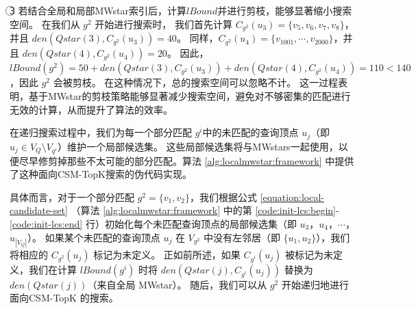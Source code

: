 \textcircled{3} 若结合全局和局部MWstar索引后，计算$lBound$并进行剪枝，能够显著缩小搜索空间。
在我们从 $g^2$ 开始进行搜索时，
我们首先计算 $C_{g^2}(u_3)=\{v_5, v_6, v_7, v_8\}$，并且 $den(Qstar(3), C_{g^2}(u_3)) = 40$。
同样，$C_{g^2}(u_4)=\{v_{1001}, \cdots, v_{2000}\}$，并且 $den(Qstar(4), C_{g^2}(u_4)) = 20$。
因此，$lBound(g^2)=50+den(Qstar(3), C_{g^2}(u_3))+den(Qstar(4), C_{g^2}(u_4))=110<140$，因此 $g^2$ 会被剪枝。
在这种情况下，总的搜索空间可以忽略不计。
这一过程表明，基于MWstar的剪枝策略能够显著减少搜索空间，避免对不够密集的匹配进行无效的计算，从而提升了算法的效率。

在递归搜索过程中，我们为每一个部分匹配 $g^i$中的未匹配的查询顶点 $u_j$（即 $u_j \in V_Q \setminus V_{q^i}$）维护一个局部候选集。
这些局部候选集将与MWstars一起使用，以便尽早修剪掉那些不太可能的部分匹配。算法 \ref{alg:localmwstar:framework} 中提供了这种面向CSM-TopK搜索的伪代码实现。

具体而言，对于一个部分匹配 $g^2 = \{v_1, v_2\}$，我们根据公式 \ref{equation:local-candidate-set} （算法 \ref{alg:localmwstar:framework} 中的第 \ref{code:init-lcs:begin}-\ref{code:init-lcs:end} 行）初始化每个未匹配查询顶点的局部候选集（即 $u_3$，$u_4$，$\cdots$，$u_{|V_Q|}$）。
如果某个未匹配的查询顶点 $u_j$ 在 $V_{g^2}$ 中没有左邻居（即 $\{u_1, u_2\}$），我们将相应的 $C_{g^2}(u_j)$ 标记为未定义。
正如前所述，如果 $C_{g^i}(u_j)$ 被标记为未定义，我们在计算 $lBound(g^i)$ 时将 $den(Qstar(j), C_{g^i}(u_j))$ 替换为 $den(Qstar(j))$（来自全局 MWstar）。
随后，我们可以从 $g^2$ 开始递归地进行 面向CSM-TopK 的搜索。

